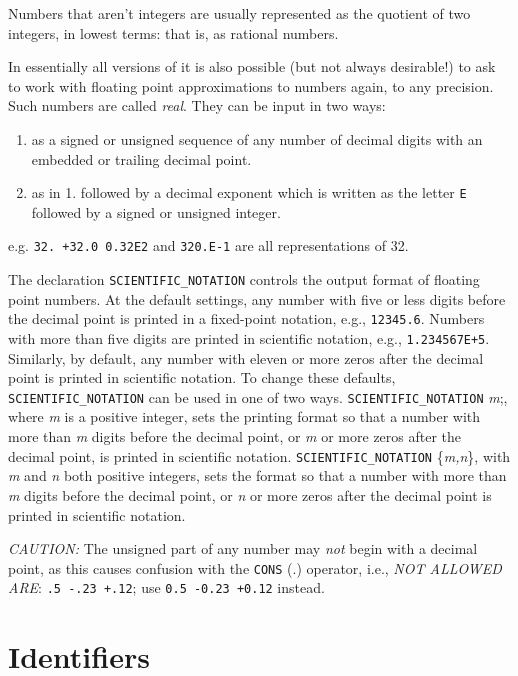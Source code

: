 Numbers that aren't integers are usually represented as the quotient of
two integers, in lowest terms: that is, as rational numbers.

In essentially all versions of {\REDUCE} it is also possible (but not always
desirable!) to ask {\REDUCE} to work with floating point approximations to
numbers again, to any precision. Such numbers are called \emph{real}.
  They can be input in two ways:
\begin{enumerate}
\item as a signed or unsigned sequence of any number of decimal digits
      with an embedded or trailing decimal point.
\item as in 1. followed by a decimal exponent which is written as the
      letter \texttt{E} followed by a signed or unsigned integer.
\end{enumerate}
e.g. \texttt{32. +32.0 0.32E2} and \texttt{320.E-1} are all representations of
32.

The declaration \texttt{SCIENTIFIC\_NOTATION}
controls the output format of floating point numbers.  At
the default settings, any number with five or less digits before the
decimal point is printed in a fixed-point notation, e.g., \texttt{12345.6}.
Numbers with more than five digits are printed in scientific notation,
e.g., \texttt{1.234567E+5}.  Similarly, by default, any number with eleven or
more zeros after the decimal point is printed in scientific notation.  To
change these defaults, \texttt{SCIENTIFIC\_NOTATION} can be used in one of two
ways. \texttt{SCIENTIFIC\_NOTATION} \emph{m};, where \emph{m} is a positive
integer, sets the printing format so that a number with more than \emph{m}
digits before the decimal point, or {\em m\/} or more zeros after the
decimal point, is printed in scientific notation. \texttt{SCIENTIFIC\_NOTATION}
\{\emph{m,n}\}, with \emph{m} and \emph{n} both positive integers, sets the
format so that a number with more than \emph{m} digits before the decimal
point, or \emph{n} or more zeros after the decimal point is printed in
scientific notation.

\textit{CAUTION:}  The unsigned part of any number may \emph{not}
begin with a decimal point, as this causes confusion with the \texttt{CONS} (.)
operator, i.e., \emph{NOT ALLOWED ARE}: \texttt{.5  -.23  +.12};
use \texttt{0.5 -0.23 +0.12} instead.

\section{Identifiers}

